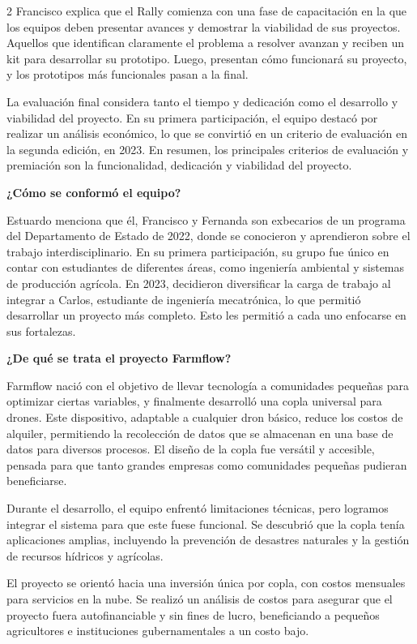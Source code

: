 \documentclass[12pt,spanish,Letterpaper,openany]{book}
\begin{document}
\begin {multicols}{2}
Francisco explica que el Rally comienza con una fase de capacitación en la que los equipos deben presentar avances y demostrar la viabilidad de sus proyectos. Aquellos que identifican claramente el problema a resolver avanzan y reciben un kit para desarrollar su prototipo. Luego, presentan cómo funcionará su proyecto, y los prototipos más funcionales pasan a la final.

La evaluación final considera tanto el tiempo y dedicación como el desarrollo y viabilidad del proyecto. En su primera participación, el equipo destacó por realizar un análisis económico, lo que se convirtió en un criterio de evaluación en la segunda edición, en 2023. En resumen, los principales criterios de evaluación y premiación son la funcionalidad, dedicación y viabilidad del proyecto.

\textbf{¿Cómo se conformó el equipo?}

Estuardo menciona que él, Francisco y Fernanda son exbecarios de un programa del Departamento de Estado de 2022, donde se conocieron y aprendieron sobre el trabajo interdisciplinario. En su primera participación, su grupo fue único en contar con estudiantes de diferentes áreas, como ingeniería ambiental y sistemas de producción agrícola. En 2023, decidieron diversificar la carga de trabajo al integrar a Carlos, estudiante de ingeniería mecatrónica, lo que permitió desarrollar un proyecto más completo. Esto les permitió a cada uno enfocarse en sus fortalezas.

\textbf{¿De qué se trata el proyecto Farmflow?}

Farmflow nació con el objetivo de llevar tecnología a comunidades pequeñas para optimizar ciertas variables, y finalmente desarrolló una copla universal para drones. Este dispositivo, adaptable a cualquier dron básico, reduce los costos de alquiler, permitiendo la recolección de datos que se almacenan en una base de datos para diversos procesos. El diseño de la copla fue versátil y accesible, pensada para que tanto grandes empresas como comunidades pequeñas pudieran beneficiarse.

Durante el desarrollo, el equipo enfrentó limitaciones técnicas, pero logramos integrar el sistema para que este fuese funcional. Se descubrió que la copla tenía aplicaciones amplias, incluyendo la prevención de desastres naturales y la gestión de recursos hídricos y agrícolas.

El proyecto se orientó hacia una inversión única por copla, con costos mensuales para servicios en la nube. Se realizó un análisis de costos para asegurar que el proyecto fuera autofinanciable y sin fines de lucro, beneficiando a pequeños agricultores e instituciones gubernamentales a un costo bajo.


\end{multicols}
\end{document}
